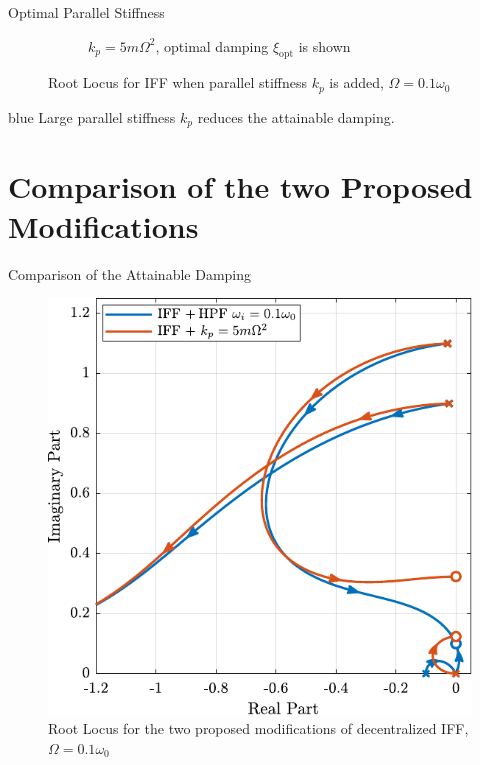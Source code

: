 \documentclass[t, minted]{clean-beamer}
\begin{document}
\begin{frame}[label={sec:org8be51fd}]{Optimal Parallel Stiffness}
\begin{figure}[htbp]
\begin{subfigure}[c]{0.49\linewidth}
\caption{\label{fig:root_locus_opt_gain_iff_kp} \(k_p = 5 m \Omega^2\), optimal damping \(\xi_\text{opt}\) is shown}
\end{subfigure}
\hfill
\caption{Root Locus for IFF when parallel stiffness \(k_p\) is added, \(\Omega = 0.1 \omega_0\)}
\centering
\end{figure}

\begin{cbox}[]{blue}{}
\centering
Large parallel stiffness \(k_p\) reduces the attainable damping.
\end{cbox}
\end{frame}

\section{Comparison of the two Proposed Modifications}
\label{sec:orge227508}
\begin{frame}[label={sec:org783f2c4}]{Comparison of the Attainable Damping}
\begin{figure}[htbp]
\centering
\includegraphics[width=0.7\linewidth]{figs/comp_root_locus.pdf}
\caption{Root Locus for the two proposed modifications of decentralized IFF, \(\Omega = 0.1 \omega_0\)}
\end{figure}
\end{frame}
\end{document}
